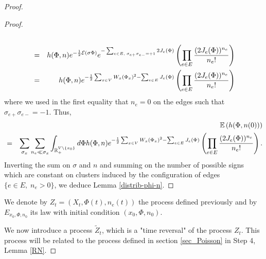\documentclass[11pt,a4paper]{amsart}
\numberwithin{equation}{section}
\def\R{{\mathbb R}}
\def\N{{\mathbb N}}
\def\E{{\mathbb{E}}}
\def\demi{{1\over 2}}
\def\eee{{\mathcal E}}
\begin{document}
\begin{proof}
\begin{proof}
\begin{eqnarray*}
 \\
 &=&
h(\Phi,n)   e^{-\demi \eee(\sigma\Phi)}e^{-\sum_{e\in E, \; \sigma_{e+}\sigma_{e-}=+1} 2J_e(\Phi)}\left(\prod_{e\in E} {(2J_e(\Phi))^{n_e}\over n_e!}\right)
 \\
  &=&
 h(\Phi,n)  e^{-\demi\sum_{x\in V} W_x (\Phi_x)^2-\sum_{e\in E} J_e(\Phi)}\left(\prod_{e\in E} {(2J_e(\Phi))^{n_e}\over n_e!}\right)
\end{eqnarray*}
where we used in the first equality that $n_e=0$ on the edges such that  
$\sigma_{e+}\sigma_{e-}=-1$.
Thus,
\begin{eqnarray*}
&&\E\left(h(\Phi, n(0))\right)
\\
&=&
\sum_{\sigma_x}\sum_{n_e\ll \sigma_x}
 \int_{\R_+^{V\setminus\{x_0\}}} d\Phi h(\Phi, n) e^{-\demi\sum_{x\in V} W_x (\Phi_x)^2-\sum_{e\in E} J_e(\Phi)}\left(\prod_{e\in E} {(2J_e(\Phi))^{n_e}\over n_e!}\right).
\end{eqnarray*}
Inverting the sum on $\sigma$ and $n$ and summing on the number of possible signs which are constant on  clusters induced by the configuration of edges
$\{e\in E, \; n_e>0\}$,
we deduce Lemma \ref{distrib-phi-n}.
\end{proof}
 We denote by $Z_t=(X_t, \Phi(t), n_e(t))$ the process defined previously and by
$E_{x_0, \Phi, n_0}$ its law with initial condition $(x_0, \Phi, n_0)$. 

We now introduce a process $\tilde Z_t$, which is a "time reversal" of the process $Z_t$. This process will be related to the 
process defined in section \ref{sec_Poisson} in Step 4, Lemma \ref{RN}.


\end{proof}
\end{document}
